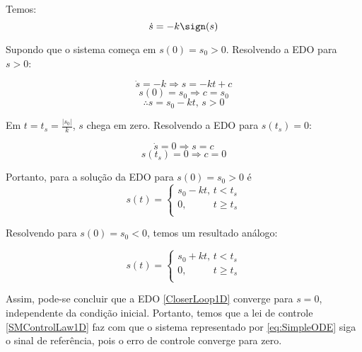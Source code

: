 Temos:
\begin{equation} \label{CloserLoop1D}
\dot{s} = -k \sign(s) 
\end{equation}

Supondo que o sistema come\c{c}a em $s(0) = s_0 >0$. Resolvendo a EDO para $s>0$:

$$ \dot{s} = -k \Rightarrow s = -k t + c $$
$$ s(0) = s_0 \Rightarrow c = s_0 $$
$$ \therefore s = s_0 - k t, \, s>0 $$

Em $t = t_s = \frac{|s_0|}{k}$, $s$ chega em zero. Resolvendo a EDO para $s(t_s) = 0$:

$$ \dot{s} = 0 \Rightarrow s =  c $$
$$ s(t_s) = 0 \Rightarrow c = 0 $$

Portanto, para a solu\c{c}\~ao da EDO para $s(0) = s_0 > 0$ é
\begin{equation} \label{eq:SM-ODE-Sol1}
s(t) =
\begin{cases}
s_0 - k t, \, t < t_s \\
0, \,\,\,\,\,\,\,\,\,\,\,\,\,\,\,\, t \geq t_s \\
\end{cases}
\end{equation}

Resolvendo para $s(0) = s_0 < 0$, temos um resultado an\'alogo:

\begin{equation} \label{eq:SM-ODE-Sol2}
s(t) =
\begin{cases}
s_0 + k t, \, t < t_s \\
0, \,\,\,\,\,\,\,\,\,\,\,\,\,\,\,\, t \geq t_s \\
\end{cases}
\end{equation}

Assim, pode-se concluir que a EDO \eqref{CloserLoop1D} converge para $s=0$, independente da condi\c{c}\~ao inicial. Portanto, temos que a lei de controle \eqref{SMControlLaw1D} faz com que o sistema representado por \eqref{eq:SimpleODE} siga o sinal de refer\^encia, pois o erro de controle converge para zero.

